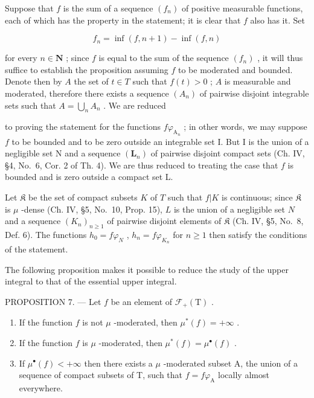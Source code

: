 Suppose that \(f\) is the sum of a sequence \((f_n)\) of positive measurable functions, each of which has the property in the statement; it is clear that \(f\) also has it. Set

\[
f _ {n} = \inf (f, n + 1) - \inf (f, n)
\]

for every \(n \in \mathbf{N}\) ; since \(f\) is equal to the sum of the sequence \((f_n)\) , it will thus suffice to establish the proposition assuming \(f\) to be moderated and bounded. Denote then by \(A\) the set of \(t \in T\) such that \(f(t) > 0\) ; \(A\) is measurable and moderated, therefore there exists a sequence \((A_n)\) of pairwise disjoint integrable sets such that \(A = \bigcup_{n} A_n\) . We are reduced

to proving the statement for the functions \(f\varphi_{\mathrm{A}_n}\) ; in other words, we may suppose \(f\) to be bounded and to be zero outside an integrable set I. But I is the union of a negligible set N and a sequence \((\mathbf{L}_n)\) of pairwise disjoint compact sets (Ch. IV, §4, No.~6, Cor. 2 of Th. 4). We are thus reduced to treating the case that \(f\) is bounded and is zero outside a compact set L.

Let \(\mathfrak{K}\) be the set of compact subsets \(K\) of \(T\) such that \(f|K\) is continuous; since \(\mathfrak{K}\) is \(\mu\) -dense (Ch. IV, §5, No.~10, Prop. 15), \(L\) is the union of a negligible set \(N\) and a sequence \((K_n)_{n \geqslant 1}\) of pairwise disjoint elements of \(\mathfrak{K}\) (Ch. IV, §5, No.~8, Def. 6). The functions \(h_0 = f\varphi_N\) , \(h_n = f\varphi_{K_n}\) for \(n \geqslant 1\) then satisfy the conditions of the statement.

The following proposition makes it possible to reduce the study of the upper integral to that of the essential upper integral.

PROPOSITION 7. --- Let \(f\) be an element of \(\mathcal{F}_{+}(\mathrm{T})\) .

\begin{enumerate}
\def\labelenumi{\arabic{enumi})}
\item
  If the function \(f\) is not \(\mu\) -moderated, then \(\mu^{*}(f) = +\infty\) .
\item
  If the function \(f\) is \(\mu\) -moderated, then \(\mu^{*}(f) = \mu^{\bullet}(f)\) .
\item
  If \(\mu^{\bullet}(f) < +\infty\) then there exists a \(\mu\) -moderated subset A, the union of a sequence of compact subsets of T, such that \(f = f\varphi_{\mathrm{A}}\) locally almost everywhere.
\end{enumerate}


